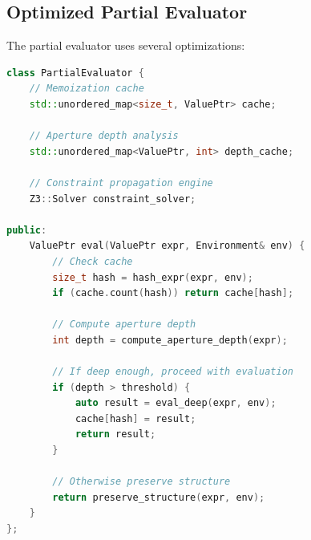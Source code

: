 \documentclass[12pt]{article}
\begin{document}
\subsection{Optimized Partial Evaluator}

The partial evaluator uses several optimizations:

\begin{lstlisting}[language=C++]
class PartialEvaluator {
    // Memoization cache
    std::unordered_map<size_t, ValuePtr> cache;
    
    // Aperture depth analysis
    std::unordered_map<ValuePtr, int> depth_cache;
    
    // Constraint propagation engine
    Z3::Solver constraint_solver;
    
public:
    ValuePtr eval(ValuePtr expr, Environment& env) {
        // Check cache
        size_t hash = hash_expr(expr, env);
        if (cache.count(hash)) return cache[hash];
        
        // Compute aperture depth
        int depth = compute_aperture_depth(expr);
        
        // If deep enough, proceed with evaluation
        if (depth > threshold) {
            auto result = eval_deep(expr, env);
            cache[hash] = result;
            return result;
        }
        
        // Otherwise preserve structure
        return preserve_structure(expr, env);
    }
};
\end{lstlisting}
\end{document}
